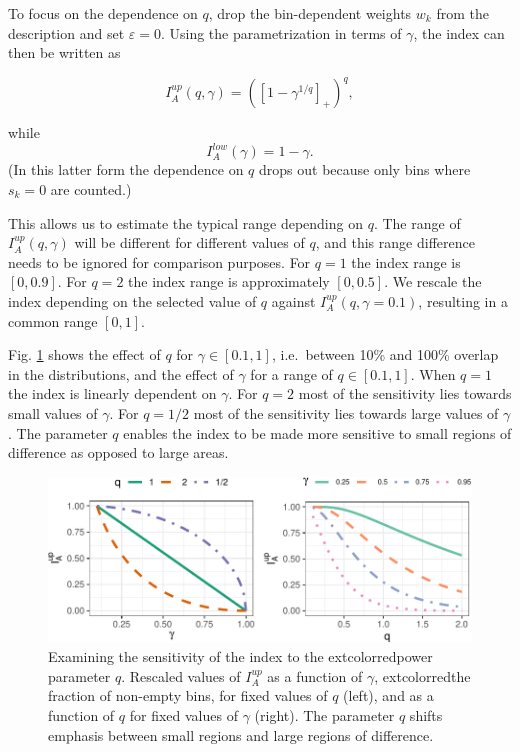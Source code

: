 \documentclass[]{interact}
\theoremstyle{plain}%
\theoremstyle{definition}
\theoremstyle{remark}
\begin{document}
To focus on the dependence on \(q\), drop the bin-dependent weights
\(w_k\) from the description and set \(\varepsilon=0\). Using the
parametrization in terms of \(\gamma\), the index can then be written as

\begin{equation}
I_A^{up}(q, \gamma) = ([1-\gamma^{1/q}]_+)^q,
\label{eq:p1}
\end{equation}

\noindent while \begin{equation}
I_A^{low}(\gamma) = 1-\gamma.
\end{equation} (In this latter form the dependence on \(q\) drops out
because only bins where \(s_k=0\) are counted.)

This allows us to estimate the typical range depending on \(q\). The
range of \(I_A^{up}(q, \gamma)\) will be different for different values
of \(q\), and this range difference needs to be ignored for comparison
purposes. For \(q=1\) the index range is \([0,0.9]\). For \(q=2\) the
index range is approximately \([0, 0.5]\). We rescale the index
depending on the selected value of \(q\) against
\(I_A^{up}(q, \gamma=0.1)\), resulting in a common range \([0,1]\).

Fig. \ref{fig:behavior} shows the effect of \(q\) for
\(\gamma \in [0.1, 1]\), i.e.~between 10\% and 100\% overlap in the
distributions, and the effect of \(\gamma\) for a range of
\(q \in [0.1, 1]\). When \(q=1\) the index is linearly dependent on
\(\gamma\). For \(q=2\) most of the sensitivity lies towards small
values of \(\gamma\). For \(q=1/2\) most of the sensitivity lies towards
large values of \(\gamma\). The parameter \(q\) enables the index to be
made more sensitive to small regions of difference as opposed to large
areas.

\begin{figure}

{\centering \includegraphics[width=1\linewidth]{section_pursuit_files/figure-latex/behavior-1} 

}

\caption{Examining the sensitivity of the index to the  extcolor{red}{power} parameter $q$. Rescaled values of $I_A^{up}$ as a function of $\gamma$,    extcolor{red}{the fraction of non-empty bins,} for fixed values of $q$ (left), and as a function of $q$ for fixed values of $\gamma$ (right). The parameter $q$ shifts emphasis between small regions and large regions of difference.}\label{fig:behavior}
\end{figure}
\end{document}
